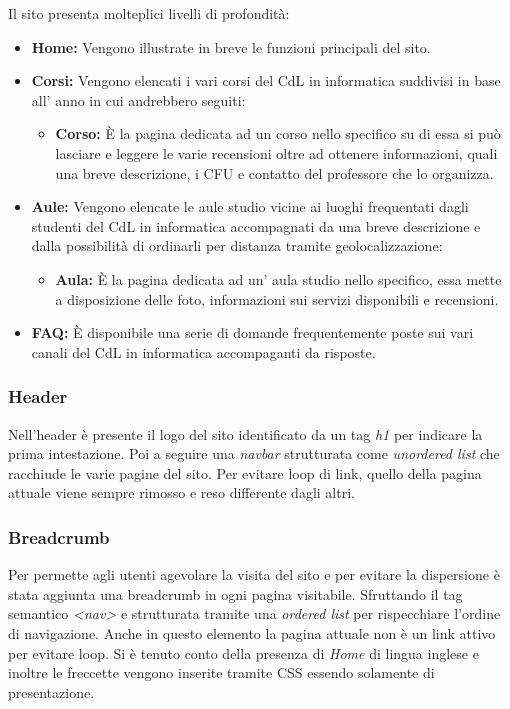 Il sito presenta molteplici livelli di profondità:
\begin{itemize}
    \item \textbf{Home:} Vengono illustrate in breve le funzioni principali del sito.
    \item \textbf{Corsi:} Vengono elencati i vari corsi del CdL in informatica suddivisi in base all' anno in cui andrebbero seguiti:
        \begin{itemize}
            \item \textbf{Corso:} È la pagina dedicata ad un corso nello specifico su di essa si può lasciare e leggere le varie recensioni oltre ad ottenere informazioni, quali una breve descrizione, i CFU e contatto del professore che lo organizza.
        \end{itemize}
    \item \textbf{Aule:} Vengono elencate le aule studio vicine ai luoghi frequentati dagli studenti del CdL in informatica accompagnati da una breve descrizione e dalla possibilità di ordinarli per distanza tramite geolocalizzazione:
        \begin{itemize}
            \item \textbf{Aula:} È la pagina dedicata ad un' aula studio nello specifico, essa mette a disposizione delle foto, informazioni sui servizi disponibili e recensioni.
        \end{itemize}
    \item \textbf{FAQ:} È disponibile una serie di domande frequentemente poste sui vari canali del CdL in informatica accompaganti da risposte.
\end{itemize}

\subsubsection{Header}
Nell'header è presente il logo del sito identificato da un tag \textit{h1} per indicare la prima intestazione. Poi a seguire una \textit{navbar} strutturata come \textit{unordered list} che racchiude le varie pagine del sito. Per evitare loop di link, quello della pagina attuale viene sempre rimosso e reso differente dagli altri.

\subsubsection{Breadcrumb}
Per permette agli utenti agevolare la visita del sito e per evitare la dispersione è stata aggiunta una breadcrumb in ogni pagina visitabile. Sfruttando il tag semantico \textit{<nav>} e strutturata tramite una \textit{ordered list} per rispecchiare l'ordine di navigazione. Anche in questo elemento la pagina attuale non è un link attivo per evitare loop. Si è tenuto conto della presenza di \textit{Home} di lingua inglese e inoltre le freccette vengono inserite tramite CSS essendo solamente di presentazione.

